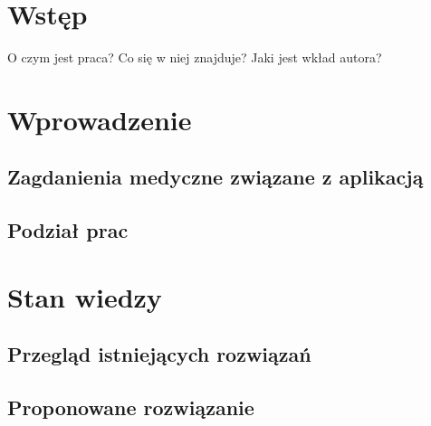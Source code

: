 \documentclass[a4paper,11pt,twoside]{report}
\theoremstyle{definition}
\begin{document}
\thispagestyle{empty}
\newpage

\null\thispagestyle{empty}\newpage


\tableofcontents
\thispagestyle{empty}

\newpage %

\null\thispagestyle{empty}\newpage
\pagestyle{fancy}
\setcounter{page}{12} %

\chapter*{Wstęp}

O czym jest praca? Co się w niej znajduje? Jaki jest wkład autora?

\chapter {Wprowadzenie}

\section {Zagdanienia medyczne związane z aplikacją}

\section {Podział prac}


\chapter {Stan wiedzy}

\section {Przegląd istniejących rozwiązań}

\section {Proponowane rozwiązanie}
\end{document}
